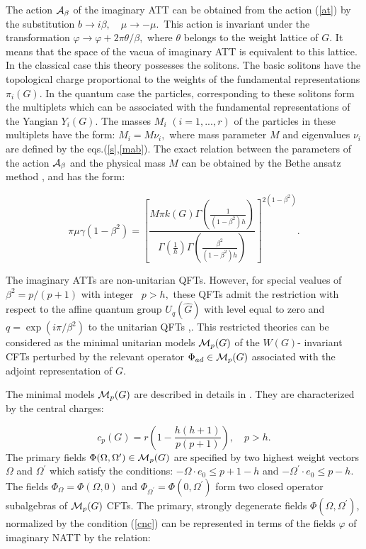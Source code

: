 \documentclass[a4paper,12pt]{article}
\begin{document}
The action ${\cal A}_\beta $ of the imaginary ATT can be obtained from the
action (\ref{at}) by the substitution $b\rightarrow i\beta ,\quad \mu
\rightarrow -\mu .\,$ This action is invariant under the transformation 
$\varphi \rightarrow \varphi +2\pi \theta /\beta ,$ where $\theta $ belongs
to the weight lattice of $G.$ It means that the space of the vacua of
imaginary ATT is equivalent to this lattice. In the classical case this
theory possesses the solitons. The basic solitons have the topological charge
proportional to the weights of the fundamental representations $\pi _i(G).$
In the quantum case the particles, corresponding to these solitons form the
multiplets which can be associated with the fundamental representations of
the Yangian $Y_i(G)$. The masses $M_i$ $(i=1,...,r)$ of the particles in
these multiplets have the form: $M_i=M\nu _i,$ where mass parameter $M$ and
eigenvalues $\nu _i$ are defined by the eqs.(\ref{s},\ref{mab}). The exact
relation between the parameters of the action ${\cal A}_\beta $ and the
physical mass $M$ can be obtained by the Bethe ansatz method \cite{ALZ},\cite
{F} and has the form:

\begin{equation}
\pi \mu \gamma (1-\beta ^2)=\left[ \frac{M\pi k(G)\Gamma \left( \frac 1{
(1-\beta ^2)h}\right) }{\Gamma \left( \frac 1h\right) \Gamma \left( \frac{
\beta ^2}{(1-\beta ^2)h}\right) }\right] ^{2(1-\beta ^2)}.  \label{immu}
\end{equation}

The imaginary ATTs are non-unitarian QFTs. However, for special vealues of 
 $\beta ^2=p/(p+1)$
with integer \ $p>h,$ these QFTs admit the restriction with respect to the
affine quantum group $U_q(\hat{G})$ with level equal to zero and 
$q=\exp(i\pi /\beta ^2)$ to the unitarian QFTs \cite{RS},\cite{BL}. 
This restricted theories can be 
considered as the minimal unitarian models 
${\cal M}_p(G)$ of the $W(G)$- invariant
CFTs perturbed by the relevant operator $\Phi _{ad}\in {\cal M}_p(G)$
associated with the adjoint representation of $G$. 

The minimal models ${\cal M}_p(G)$ are described in details in \cite{FL}. 
They are characterized by the central charges:

\begin{equation}
c_p(G)=r\left( 1-\frac{h(h+1)}{p(p+1)}\right) ,\quad p>h.  \label{cch}
\end{equation}
The primary fields $\Phi (\Omega ,\Omega ^{\prime })\in {\cal M}_p(G)$ are
specified by two highest weight vectors $\Omega $ and $\Omega ^{\prime }$
which satisfy the conditions: $-\Omega \cdot e_0\leq p+1-h$ and  
$-\Omega ^{\prime}\cdot e_0\leq p-h$. 
The fields $\Phi _\Omega =\Phi (\Omega ,0)$ and $\Phi
_{\Omega ^{\prime }}=\Phi (0,\Omega ^{\prime })$ form two closed operator
subalgebras of ${\cal M}_p(G)$ CFTs. The primary, strongly degenerate 
fields $\Phi (\Omega,\Omega ^{\prime })$, normalized by the condition 
(\ref{cnc}) can be
represented in terms of the fields $\varphi $ of imaginary NATT by the
relation:
\end{document}
